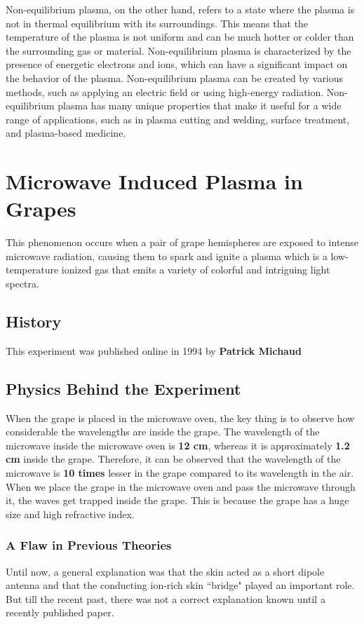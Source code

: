 \documentclass{article}
\begin{document}
Non-equilibrium plasma, on the other hand, refers to a state where the plasma is not in thermal equilibrium with its surroundings. This means that the temperature of the plasma is not uniform and can be much hotter or colder than the surrounding gas or material. Non-equilibrium plasma is characterized by the presence of energetic electrons and ions, which can have a significant impact on the behavior of the plasma. Non-equilibrium plasma can be created by various methods, such as applying an electric field or using high-energy radiation.
\cite{10}
Non-equilibrium plasma has many unique properties that make it useful for a wide range of applications, such as in plasma cutting and welding, surface treatment, and plasma-based medicine. 


\section{Microwave Induced Plasma in Grapes}

This phenomenon occurs when a pair of grape hemispheres are exposed to intense microwave radiation, causing them to spark and ignite a plasma which is a low-temperature ionized gas that emits a variety of colorful and intriguing light spectra. 

\subsection{History}
\large
This experiment was published online in 1994 by 
\textbf{Patrick Michaud}

\subsection{\Large Physics Behind the Experiment}
\large
When the grape is placed in the microwave oven, the key thing is to observe how considerable the wavelengths are inside the grape.
The wavelength of the microwave inside the microwave oven is \textbf{12 cm}, whereas it is approximately \textbf{1.2 cm} inside the grape. Therefore, it can be observed that the wavelength of the microwave is \textbf{10 times} lesser in the grape compared to its wavelength in the air.
When we place the grape in the microwave oven and pass the microwave through it, the waves get trapped inside the grape. This is because the grape has a huge size and high refractive index.


\subsubsection{\large A Flaw in Previous Theories}
Until now, a general explanation was that the skin acted as a short dipole antenna and that the conducting ion-rich skin “bridge" played an important role. But till the recent past, there was not a correct explanation known until a recently published paper.\cite{3}
\end{document}
